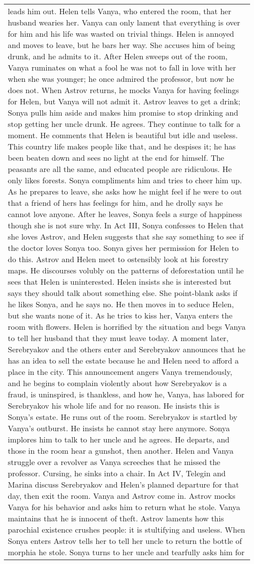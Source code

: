 \documentclass{article} \usepackage{iclr2022_conference,times}
\begin{document}
\begin{table}[!htbp]
\begin{tabular}{p{\linewidth}}
leads him out. Helen tells Vanya, who entered the room, that her husband wearies her. Vanya can only lament that everything is over for him and his life was wasted on trivial things. Helen is annoyed and moves to leave, but he bars her way. She accuses him of being drunk, and he admits to it. After Helen sweeps out of the room, Vanya ruminates on what a fool he was not to fall in love with her when she was younger; he once admired the professor, but now he does not. When Astrov returns, he mocks Vanya for having feelings for Helen, but Vanya will not admit it. Astrov leaves to get a drink; Sonya pulls him aside and makes him promise to stop drinking and stop getting her uncle drunk. He agrees. They continue to talk for a moment. He comments that Helen is beautiful but idle and useless. This country life makes people like that, and he despises it; he has been beaten down and sees no light at the end for himself. The peasants are all the same, and educated people are ridiculous. He only likes forests. Sonya compliments him and tries to cheer him up. As he prepares to leave, she asks how he might feel if he were to out that a friend of hers has feelings for him, and he drolly says he cannot love anyone. After he leaves, Sonya feels a surge of happiness though she is not sure why. In Act III, Sonya confesses to Helen that she loves Astrov, and Helen suggests that she say something to see if the doctor loves Sonya too. Sonya gives her permission for Helen to do this. Astrov and Helen meet to ostensibly look at his forestry maps. He discourses volubly on the patterns of deforestation until he sees that Helen is uninterested. Helen insists she is interested but says they should talk about something else. She point-blank asks if he likes Sonya, and he says no. He then moves in to seduce Helen, but she wants none of it. As he tries to kiss her, Vanya enters the room with flowers. Helen is horrified by the situation and begs Vanya to tell her husband that they must leave today. A moment later, Serebryakov and the others enter and Serebryakov announces that he has an idea to sell the estate because he and Helen need to afford a place in the city. This announcement angers Vanya tremendously, and he begins to complain violently about how Serebryakov is a fraud, is uninspired, is thankless, and how he, Vanya, has labored for Serebryakov his whole life and for no reason. He insists this is Sonya's estate. He runs out of the room. Serebryakov is startled by Vanya's outburst. He insists he cannot stay here anymore. Sonya implores him to talk to her uncle and he agrees. He departs, and those in the room hear a gunshot, then another. Helen and Vanya struggle over a revolver as Vanya screeches that he missed the professor. Cursing, he sinks into a chair. In Act IV, Telegin and Marina discuss Serebryakov and Helen's planned departure for that day, then exit the room. Vanya and Astrov come in. Astrov mocks Vanya for his behavior and asks him to return what he stole. Vanya maintains that he is innocent of theft. Astrov laments how this parochial existence crushes people: it is stultifying and useless. When Sonya enters Astrov tells her to tell her uncle to return the bottle of morphia he stole. Sonya turns to her uncle and tearfully asks him for 
\end{tabular}
\end{table}
\end{document}
